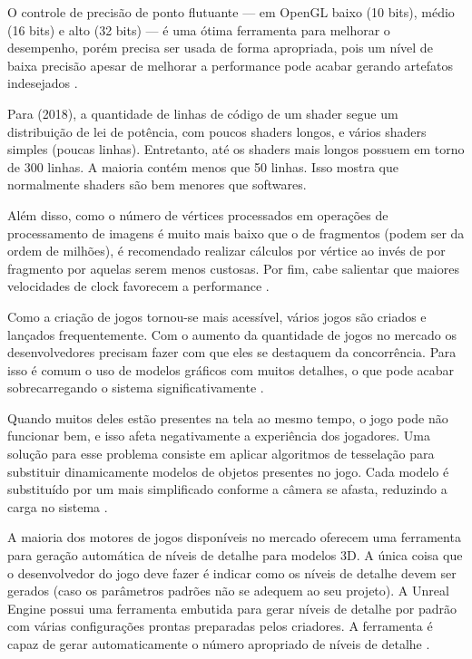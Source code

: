 O controle de precisão de ponto flutuante --- em OpenGL baixo (10 bits), médio (16 bits) e alto (32 bits) --- é uma ótima ferramenta para melhorar o desempenho, porém precisa ser usada de forma apropriada, pois um nível de baixa precisão apesar de melhorar a performance pode acabar gerando artefatos indesejados \cite{optimizationMobile}.



Para  (2018), a quantidade de linhas de código de um shader segue um distribuição de lei de potência, com poucos shaders longos, e vários shaders simples (poucas linhas). Entretanto, até os shaders mais longos possuem em torno de 300 linhas. A maioria contém menos que 50 linhas. Isso mostra que normalmente shaders são bem menores que softwares.

Além disso, como o número de vértices processados em operações de processamento de imagens é muito mais baixo que o de fragmentos (podem ser da ordem de milhões), é recomendado realizar cálculos por vértice ao invés de por fragmento por aquelas serem menos custosas. Por fim, cabe salientar que maiores velocidades de clock favorecem a performance \cite{optimizationMobile}.

Como a criação de jogos tornou-se mais acessível, vários jogos são criados e lançados frequentemente. Com o aumento da quantidade de jogos no mercado os desenvolvedores precisam fazer com que eles se destaquem da concorrência. Para isso é comum o uso de modelos gráficos com muitos detalhes, o que pode acabar sobrecarregando o sistema significativamente \cite{performanceTesselation}. 

Quando muitos deles estão presentes na tela ao mesmo tempo, o jogo pode não funcionar bem, e isso afeta negativamente a experiência dos jogadores. Uma solução para esse problema consiste em aplicar algoritmos de tesselação para substituir dinamicamente modelos de objetos presentes no jogo. Cada modelo é substituído por um mais simplificado conforme a câmera se afasta, reduzindo a carga no sistema \cite{performanceTesselation}.

A maioria dos motores de jogos disponíveis no mercado oferecem uma ferramenta para geração automática de níveis de detalhe para modelos 3D. A única coisa que o desenvolvedor do jogo deve fazer é indicar como os níveis de detalhe devem ser gerados (caso os parâmetros padrões não se adequem ao seu projeto). A Unreal Engine possui uma ferramenta embutida para gerar níveis de detalhe por padrão com várias configurações prontas preparadas pelos criadores. A ferramenta é capaz de gerar automaticamente o número apropriado de níveis de detalhe \cite{performanceTesselation}.

